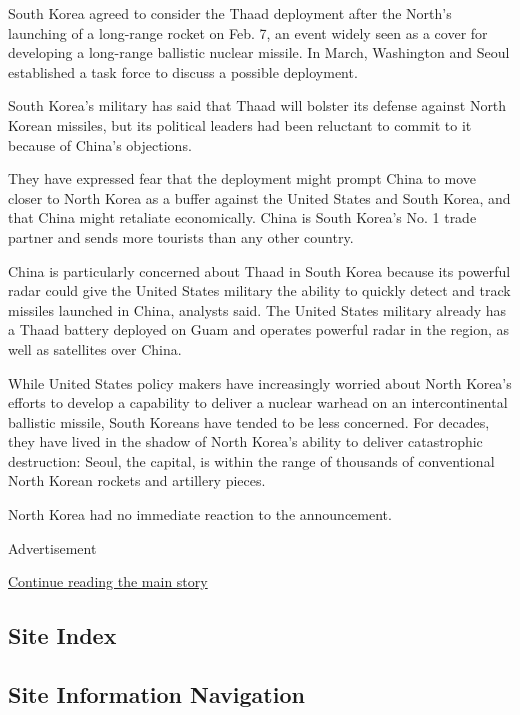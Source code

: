 South Korea agreed to consider the Thaad deployment after the North's
launching of a long-range rocket on Feb. 7, an event widely seen as a
cover for developing a long-range ballistic nuclear missile. In March,
Washington and Seoul established a task force to discuss a possible
deployment.

South Korea's military has said that Thaad will bolster its defense
against North Korean missiles, but its political leaders had been
reluctant to commit to it because of China's objections.

They have expressed fear that the deployment might prompt China to move
closer to North Korea as a buffer against the United States and South
Korea, and that China might retaliate economically. China is South
Korea's No. 1 trade partner and sends more tourists than any other
country.

China is particularly concerned about Thaad in South Korea because its
powerful radar could give the United States military the ability to
quickly detect and track missiles launched in China, analysts said. The
United States military already has a Thaad battery deployed on Guam and
operates powerful radar in the region, as well as satellites over China.

While United States policy makers have increasingly worried about North
Korea's efforts to develop a capability to deliver a nuclear warhead on
an intercontinental ballistic missile, South Koreans have tended to be
less concerned. For decades, they have lived in the shadow of North
Korea's ability to deliver catastrophic destruction: Seoul, the capital,
is within the range of thousands of conventional North Korean rockets
and artillery pieces.

North Korea had no immediate reaction to the announcement.

Advertisement

\protect\hyperlink{after-bottom}{Continue reading the main story}

\hypertarget{site-index}{%
\subsection{Site Index}\label{site-index}}

\hypertarget{site-information-navigation}{%
\subsection{Site Information
Navigation}\label{site-information-navigation}}

